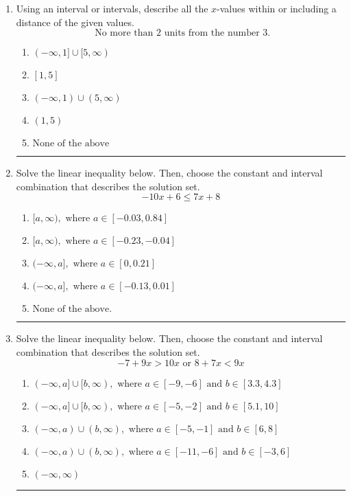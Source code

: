 \documentclass[14pt]{extbook}
\newcommand{\litem}[1]{\item#1\hspace*{-1cm}\rule{\textwidth}{0.4pt}}
\begin{document}
\begin{enumerate}
\litem{
Using an interval or intervals, describe all the $x$-values within or including a distance of the given values.\[ \text{ No more than } 2 \text{ units from the number } 3. \]\begin{enumerate}[label=\Alph*.]
\item \( (-\infty, 1] \cup [5, \infty) \)
\item \( [1, 5] \)
\item \( (-\infty, 1) \cup (5, \infty) \)
\item \( (1, 5) \)
\item \( \text{None of the above} \)

\end{enumerate} }
\litem{
Solve the linear inequality below. Then, choose the constant and interval combination that describes the solution set.\[ -10x + 6 \leq 7x + 8 \]\begin{enumerate}[label=\Alph*.]
\item \( [a, \infty), \text{ where } a \in [-0.03, 0.84] \)
\item \( [a, \infty), \text{ where } a \in [-0.23, -0.04] \)
\item \( (-\infty, a], \text{ where } a \in [0, 0.21] \)
\item \( (-\infty, a], \text{ where } a \in [-0.13, 0.01] \)
\item \( \text{None of the above}. \)

\end{enumerate} }
\litem{
Solve the linear inequality below. Then, choose the constant and interval combination that describes the solution set.\[ -7 + 9 x > 10 x \text{ or } 8 + 7 x < 9 x \]\begin{enumerate}[label=\Alph*.]
\item \( (-\infty, a] \cup [b, \infty), \text{ where } a \in [-9, -6] \text{ and } b \in [3.3, 4.3] \)
\item \( (-\infty, a] \cup [b, \infty), \text{ where } a \in [-5, -2] \text{ and } b \in [5.1, 10] \)
\item \( (-\infty, a) \cup (b, \infty), \text{ where } a \in [-5, -1] \text{ and } b \in [6, 8] \)
\item \( (-\infty, a) \cup (b, \infty), \text{ where } a \in [-11, -6] \text{ and } b \in [-3, 6] \)
\item \( (-\infty, \infty) \)


\end{enumerate}}
\end{enumerate}
\end{document}
